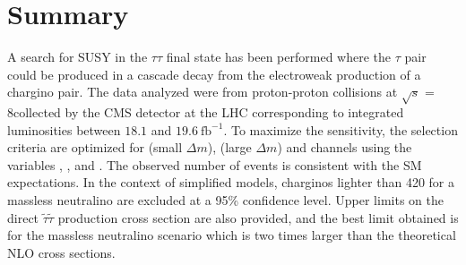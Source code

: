 \section{Summary}
\label{sect:conclusion}
A search for SUSY in the $\tau\tau$ final state has been performed where the
$\tau$ pair could be produced in a cascade decay from the electroweak production of a chargino pair.  The data analyzed were from proton-proton collisions
at $\sqrt{s}$ = 8\TeV collected by the CMS detector at the LHC corresponding to integrated luminosities between $18.1$ and $19.6~\mathrm{fb}^{-1}$. 
To maximize the sensitivity, the selection criteria are optimized for \tauTau (small $\Delta m$), 
\tauTau (large $\Delta m$) and \leptonTau channels using the variables \mttwo, \tauMT, and \SumMT.
The observed number of events is consistent with the SM expectations. 
In the context of simplified models, charginos lighter than 420\GeV 
for a massless neutralino are excluded at a 95\% confidence level. 
Upper limits on the direct $\tilde{\tau}\tilde{\tau}$ production cross section are also provided, 
and the best limit obtained is for the massless neutralino scenario which is two times
larger than the theoretical NLO cross sections. 

